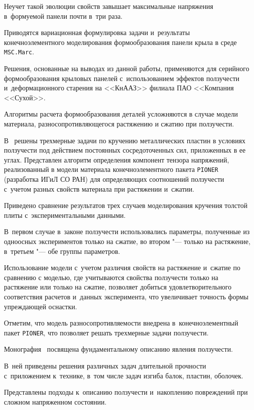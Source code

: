 Неучет такой эволюции свойств завышает максимальные напряжения в~формуемой панели почти в~три раза. 

Приводятся вариационная формулировка задачи и~результаты конечноэлементного моделирования формообразования панели крыла в среде {\tt MSC.Marc}. 

Решения, основанные на выводах из данной работы, применяются для серийного формообразования крыловых панелей с~использованием эффектов ползучести и~деформационного старения на <<КнААЗ>> филиала ПАО <<Компания <<Сухой>>. 



Алгоритмы расчета формообразования деталей усложняются в случае модели материала, разносопротивляющегося растяжению и сжатию при ползучести.

В~\cite{iya:Korobeynikov} решены трехмерные задачи по кручению металлических пластин в условиях ползучести под действием постоянных сосредоточенных сил, приложенных в ее углах. Представлен алгоритм определения компонент тензора напряжений, реализованный в модели материала конечноэлементного пакета {\tt PIONER} (разработка ИГиЛ СО РАН) для определяющих соотношений ползучести с~учетом разных свойств материала при растяжении и~сжатии. 

Приведено сравнение результатов трех случаев моделирования кручения толстой плиты с~экспериментальными данными. 

В~первом случае в~законе ползучести использовались параметры, полученные из одноосных экспериментов только на сжатие, во втором "--- только на растяжение, в~третьем "---  обе группы параметров. 

Использование модели с~учетом различия свойств на растяжение и~сжатие по сравнению с моделью, где учитываются свойства ползучести только на растяжение или только на сжатие, позволяет добиться удовлетворительного соответствия расчетов и~данных эксперимента, что увеличивает точность формы упреждающей оснастки. 

Отметим, что модель разносопротивляемости внедрена в~конечноэлементный пакет {\tt PIONER}, что позволяет решать трехмерные задачи ползучести.



Монография~\cite{iya:Lok2016} посвящена фундаментальному описанию явления ползучести. 

В~ней приведены решения различных задач длительной прочности с~приложением к~технике, в~том числе задач изгиба балок, пластин, оболочек. 

Представлены подходы к~описанию ползучести и~накоплению повреждений при сложном напряженном состоянии. 

